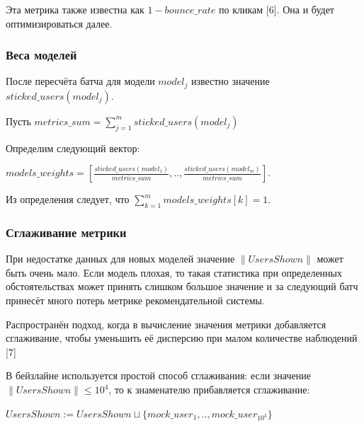 \documentclass{article}
\begin{document}
\par
\vspace{3mm}
Эта метрика также известна как $1 - bounce\_rate$ по кликам [6]. Она и будет оптимизироваться далее.



\subsubsection{Веса моделей}

После пересчёта батча для модели $model_j$ известно значение $sticked\_users(model_j)$. 
\par
\vspace{3mm}

Пусть $metrics\_sum = \sum_{j=1}^m sticked\_users(model_j)$
\par
\vspace{3mm}

Определим следующий вектор:
\par
\vspace{3mm}

$models\_weights = [\frac{sticked\_users(model_1)}{metrics\_sum}, .., \frac{sticked\_users(model_m)}{metrics\_sum}]$.

\par
\vspace{3mm}
Из определения следует, что $\sum_{k=1}^m{models\_weights[k]} = 1$.


\subsubsection{Сглаживание метрики}

При недостатке данных для новых моделей значение $\|UsersShown\|$ может быть очень мало. Если модель плохая, то такая статистика при определенных обстоятельствах может принять слишком большое значение и за следующий батч принесёт много потерь метрике рекомендательной системы.
\par
Распространён подход, когда в вычисление значения метрики добавляется сглаживание, чтобы уменьшить её дисперсию при малом количестве наблюдений [7]
\par
\vspace{3mm}
В бейзлайне используется простой способ сглаживания: если значение $\|UsersShown\| \leq 10^4$, то к знаменателю прибавляется сглаживание:
\par
\vspace{3mm}
$UsersShown := UsersShown \sqcup \{mock\_user_1, .., mock\_user_{10^3}\}$
\end{document}
